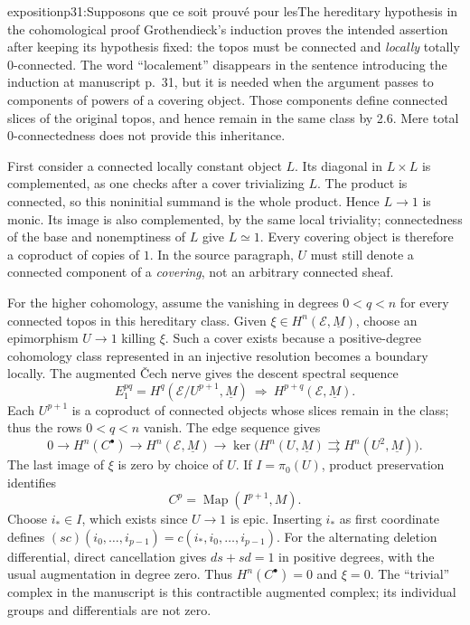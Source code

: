 \begin{dcomment}{exposition}{p31:Supposons que ce soit prouvé pour les}{The hereditary hypothesis in the cohomological proof}
Grothendieck's induction proves the intended assertion after keeping its hypothesis fixed: the topos must be connected and \emph{locally} totally $0$-connected. The word ``localement'' disappears in the sentence introducing the induction at manuscript p.~31, but it is needed when the argument passes to components of powers of a covering object. Those components define connected slices of the original topos, and hence remain in the same class by 2.6. Mere total $0$-connectedness does not provide this inheritance.

First consider a connected locally constant object $L$. Its diagonal in $L\times L$ is complemented, as one checks after a cover trivializing $L$. The product is connected, so this noninitial summand is the whole product. Hence $L\to1$ is monic. Its image is also complemented, by the same local triviality; connectedness of the base and nonemptiness of $L$ give $L\simeq1$. Every covering object is therefore a coproduct of copies of $1$. In the source paragraph, $U$ must still denote a connected component of a \emph{covering}, not an arbitrary connected sheaf.

For the higher cohomology, assume the vanishing in degrees $0<q<n$ for every connected topos in this hereditary class. Given $\xi\in H^n(\mathcal E,\underline M)$, choose an epimorphism $U\to1$ killing $\xi$. Such a cover exists because a positive-degree cohomology class represented in an injective resolution becomes a boundary locally. The augmented \v{C}ech nerve gives the descent spectral sequence
\[
 E_1^{pq}=H^q(\mathcal E/U^{p+1},\underline M)
 \ \Longrightarrow\ H^{p+q}(\mathcal E,\underline M).
\]
Each $U^{p+1}$ is a coproduct of connected objects whose slices remain in the class; thus the rows $0<q<n$ vanish. The edge sequence gives
\[
 0\longrightarrow H^n(C^\bullet)
 \longrightarrow H^n(\mathcal E,\underline M)
 \longrightarrow \ker\bigl(H^n(U,\underline M)
       \rightrightarrows H^n(U^2,\underline M)\bigr).
\]
The last image of $\xi$ is zero by choice of $U$. If $I=\pi _0(U)$, product preservation identifies
\[
 C^p=\operatorname{Map}(I^{p+1},M).
\]
Choose $i_*\in I$, which exists since $U\to1$ is epic. Inserting $i_*$ as first coordinate defines
$(sc)(i_0,\ldots,i_{p-1})=c(i_*,i_0,\ldots,i_{p-1})$.
For the alternating deletion differential, direct cancellation gives $ds+sd=1$ in positive degrees, with the usual augmentation in degree zero. Thus $H^n(C^\bullet)=0$ and $\xi=0$. The ``trivial'' complex in the manuscript is this contractible augmented complex; its individual groups and differentials are not zero.
\end{dcomment}

